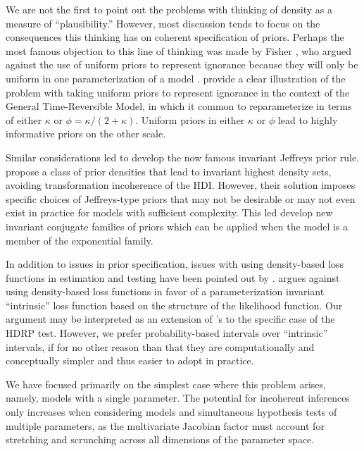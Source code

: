 \documentclass[9pt,twocolumn,twoside]{cidlab-draft}\templatetype{cidlab-invited}
\newcommand{\hdr}{HDRP}
\begin{document}
We are not the first to point out the problems with thinking of density as a measure of ``plausibility.'' However, most discussion tends to focus on the consequences this thinking has on coherent specification of priors. Perhaps the most famous objection to this line of thinking was made by Fisher \cite{lehmann2011fisher}, who argued against the use of uniform priors to represent ignorance because they will only be uniform in one parameterization of a model \cite<for a thorough demonstration see>{ly2017tutorial}.  provide a clear illustration of the problem with taking uniform priors to represent ignorance in the context of the General Time-Reversible Model, in which it common to reparameterize in terms of either $\kappa$ or $\phi = \kappa/(2+\kappa)$. Uniform priors in either $\kappa$ or $\phi$ lead to highly informative priors on the other scale. 

Similar considerations led  to develop the now famous invariant Jeffreys prior rule.  propose a class of prior densities that lead to invariant highest density sets, avoiding transformation incoherence of the HDI. However, their solution imposes specific choices of Jeffreys-type priors that may not be desirable or may not even exist in practice for models with sufficient complexity. This led  develop new invariant conjugate families of priors which can be applied when the model is a member of the exponential family. 

In addition to issues in prior specification, issues with using density-based loss functions in estimation and testing have been pointed out by . \citeauthor{bernardo2005} argues against using density-based loss functions in favor of a parameterization invariant ``intrinsic'' loss function based on the structure of the likelihood function. Our argument may be interpreted as an extension of \citeauthor{bernardo2005}'s to the specific case of the \hdr{} test. However, we prefer probability-based intervals over ``intrinsic'' intervals, if for no other reason than that they are computationally and conceptually simpler and thus easier to adopt in practice. 

We have focused primarily on the simplest case where this problem arises, namely, models with a single parameter. The potential for incoherent inferences only increases when considering models and simultaneous hypothesis tests of multiple parameters, as the multivariate Jacobian factor must account for stretching and scrunching across all dimensions of the parameter space. 
\end{document}
